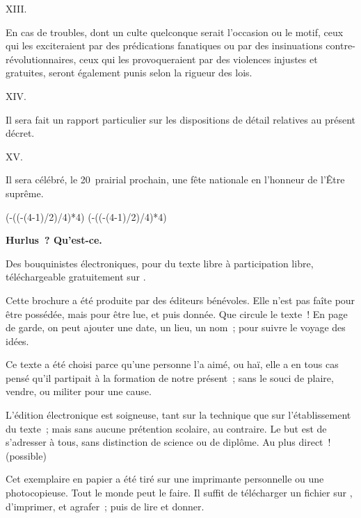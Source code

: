 \documentclass[french,twoside]{book} %
\def\truncdiv#1#2{((#1-(#2-1)/2)/#2)}
\def\moduloop#1#2{(#1-\truncdiv{#1}{#2}*#2)}
\def\modulo#1#2{\number\numexpr\moduloop{#1}{#2}\relax}
\begin{document}
XIII.\par
En cas de troubles, dont un culte quelconque serait l’occasion ou le motif, ceux qui les exciteraient par des prédications fanatiques ou par des insinuations contre-révolutionnaires, ceux qui les provoqueraient par des violences injustes et gratuites, seront également punis selon la rigueur des lois.\par
XIV.\par
Il sera fait un rapport particulier sur les dispositions de détail 
\label{\_GoBack}relatives au présent décret.\par
XV.\par
Il sera célébré, le 20 prairial prochain, une fête nationale en l’honneur de l’Être suprême.
 


\ifbooklet
  \pagestyle{empty}
  \clearpage
  \ifnum\modulo{\value{page}}{4}=0 \hbox{}\newpage\hbox{}\newpage\fi
  \ifnum\modulo{\value{page}}{4}=1 \hbox{}\newpage\hbox{}\newpage\fi


  \hbox{}\newpage
  \ifodd\value{page}\hbox{}\newpage\fi
  {\centering\color{rubric}\bfseries\noindent\large
    Hurlus ? Qu’est-ce.\par
    \bigskip
  }
  \noindent Des bouquinistes électroniques, pour du texte libre à participation libre,
  téléchargeable gratuitement sur \href{https://hurlus.fr}{}.\par
  \bigskip
  \noindent Cette brochure a été produite par des éditeurs bénévoles.
  Elle n’est pas faîte pour être possédée, mais pour être lue, et puis donnée.
  Que circule le texte !
  En page de garde, on peut ajouter une date, un lieu, un nom ; pour suivre le voyage des idées.
  \par

  Ce texte a été choisi parce qu’une personne l’a aimé,
  ou haï, elle a en tous cas pensé qu’il partipait à la formation de notre présent ;
  sans le souci de plaire, vendre, ou militer pour une cause.
  \par

  L’édition électronique est soigneuse, tant sur la technique
  que sur l’établissement du texte ; mais sans aucune prétention scolaire, au contraire.
  Le but est de s’adresser à tous, sans distinction de science ou de diplôme.
  Au plus direct ! (possible)
  \par

  Cet exemplaire en papier a été tiré sur une imprimante personnelle
   ou une photocopieuse. Tout le monde peut le faire.
  Il suffit de
  télécharger un fichier sur \href{https://hurlus.fr}{},
  d’imprimer, et agrafer ; puis de lire et donner.\par
\end{document}
